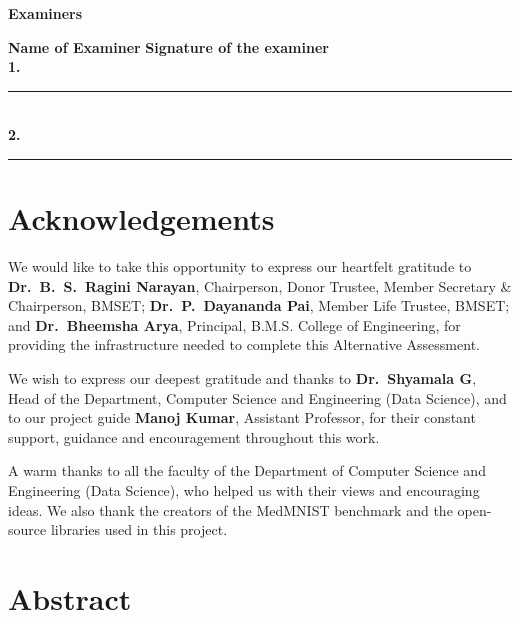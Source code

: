 \documentclass[12pt,a4paper]{report}
\begin{document}
\begin{center}
    \textbf{Examiners}
\end{center}
\vspace{-0.4cm}
\noindent
    \textbf{Name of Examiner} \hfill \textbf{Signature of the examiner} \\[0.25cm]
    \textbf{1.} \hfill \rule{5cm}{0.4pt} \\[0.25cm]
    \textbf{2.} \hfill \rule{5cm}{0.4pt}
\endgroup

\newpage

\chapter*{\centering Acknowledgements}

We would like to take this opportunity to express our heartfelt gratitude to \textbf{Dr.\ B.\ S.\ Ragini Narayan},
Chairperson, Donor Trustee, Member Secretary \& Chairperson, BMSET; \textbf{Dr.\ P.\ Dayananda Pai}, Member Life
Trustee, BMSET; and \textbf{Dr.\ Bheemsha Arya}, Principal, B.M.S. College of Engineering, for providing the
infrastructure needed to complete this Alternative Assessment.

We wish to express our deepest gratitude and thanks to \textbf{Dr.\ Shyamala G}, Head of the Department,
Computer Science and Engineering (Data Science), and to our project guide \textbf{Manoj Kumar}, Assistant
Professor, for their constant support, guidance and encouragement throughout this work.

A warm thanks to all the faculty of the Department of Computer Science and Engineering (Data Science), who helped
us with their views and encouraging ideas. We also thank the creators of the MedMNIST benchmark and the open-source
libraries used in this project.

\newpage
\tableofcontents

\begin{center}
    \listoftables
\end{center}

\begin{center}
    \listoffigures
\end{center}

\newpage

\chapter*{\centering Abstract}
\end{document}
